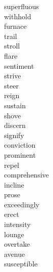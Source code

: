 \documentclass[b5paper, 11pt]{ctexart}
\begin{document}
\begin{multicols*}{3}
\begin{description}
\item[superfluous]

\item[withhold]

\item[furnace]

\item[trail]

\item[stroll]

\item[flare]

\item[sentiment]

\item[strive]

\item[steer]

\item[reign]

\item[sustain]

\item[shove]

\item[discern]

\item[signify]

\item[conviction]

\item[prominent]

\item[repel]

\item[comprehensive]

\item[incline]

\item[prose]

\item[exceedingly]

\item[erect]

\item[intensity]

\item[lounge]

\item[overtake]

\item[avenue]

\item[susceptible]


\end{description}
\end{multicols*}
\end{document}
